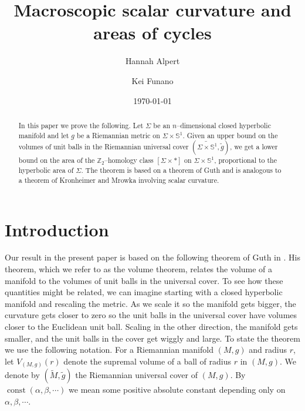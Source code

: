 \documentclass[12pt]{amsart}
\numberwithin{equation}{section}
\begin{document}
\begin{abstract}
In this paper we prove the following. Let $\Sigma$ be an $n$--dimensional closed hyperbolic manifold and let $g$ be a Riemannian metric on $\Sigma \times \mathbb{S}^1$.  Given an upper bound on the volumes of unit balls in the Riemannian universal cover $(\widetilde{\Sigma\times \mathbb{S}^1},\widetilde{g})$, we get a lower bound on the area of the $\mathbb{Z}_2$--homology class $[\Sigma \times \ast]$ on $\Sigma \times \mathbb{S}^1$, proportional to the hyperbolic area of $\Sigma$.  The theorem is based on a theorem of Guth and is analogous to a theorem of Kronheimer and Mrowka involving scalar curvature.
 \end{abstract}

	\title[Macroscopic scalar curvature and areas of cycles]
	{Macroscopic scalar curvature and areas of cycles}

    \author[Hannah Alpert]{Hannah Alpert}
    \address{Ohio State University, 43210-1174 USA}

    \author[Kei Funano]{Kei Funano}
	\address{Tohoku
	University, Sendai, 980-8579 Japan}

\date{\today}

\maketitle

\section{Introduction} 
Our result in the present paper is based on the following theorem of
Guth in \cite[Theorem 2]{Guth11}.  His theorem, which we refer to as the
volume theorem, relates the volume of a manifold to the
volumes of unit balls in the universal cover.  To see how these
quantities might be related, we can imagine starting with a closed
hyperbolic manifold and rescaling the metric.  As we scale it so the
manifold gets bigger, the curvature gets closer to zero so the unit
balls in the universal cover have volumes closer to the Euclidean unit
ball.  Scaling in the other direction, the manifold gets smaller, and
the unit balls in the cover get wiggly and large.  To state the theorem
we use the following notation.  For a Riemannian manifold $(M,g)$ and
radius $r$, let $V_{(M,g)}(r)$ denote the supremal volume of a ball of
radius $r$ in $(M,g)$. We denote by $(\widetilde{M},\widetilde{g})$ the
Riemannian universal cover of $(M,g)$. By $\operatorname{const}
(\alpha,\beta,\cdots)$ we mean some positive absolute constant depending only on $\alpha,\beta,\cdots$.
\end{document}
